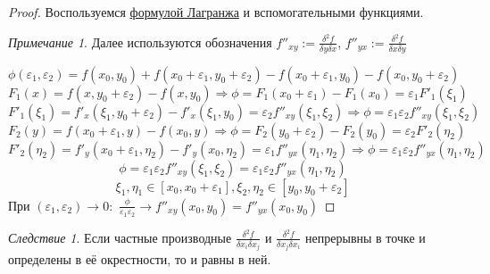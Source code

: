 \documentclass{article}
\theoremstyle{indented}
\theoremstyle{definition}
\theoremstyle{remark}
\newtheorem*{remark}{Примечание}
\newtheorem*{cons}{Следствие}
\begin{document}
\begin{proof}
    Воспользуемся \hyperlink{lagrange}{формулой Лагранжа} и вспомогательными функциями.
    

    \begin{remark}
        Далее используются обозначения
        $f''_{xy}:=\frac{\delta^2 f}{\delta y \delta x}$,
        $f''_{yx}:=\frac{\delta^2 f}{\delta x \delta y}$
    \end{remark}

    \[\phi(\varepsilon_1, \varepsilon_2) =
        f(x_0, y_0)+f(x_0+\varepsilon_1, y_0+\varepsilon_2)
        -f(x_0+\varepsilon_1, y_0)-f(x_0, y_0+\varepsilon_2)\]
    \[F_1(x)=f(x,y_0+\varepsilon_2)-f(x,y_0)
        \Rightarrow \phi = F_1(x_0+\varepsilon_1)-F_1(x_0) = \varepsilon_1 F'_1(\xi_1)\]
    \[F'_1(\xi_1)=f'_x(\xi _1, y_0+\varepsilon_2)-f'_x(\xi_1,y_0)=
        \varepsilon_2 f''_{xy}(\xi_1, \xi_2)
        \Rightarrow \phi = \varepsilon_1 \varepsilon_2 f''_{xy}(\xi_1, \xi_2)\]
    \[F_2(y)=f(x_0+\varepsilon_1,y)-f(x_0,y)
        \Rightarrow \phi = F_2(y_0+\varepsilon_2)-F_2(y_0) = \varepsilon_2 F'_2(\eta_2)\]
    \[F'_2(\eta_2)=f'_y(x_0+\varepsilon_1,\eta_2)-f'_y(x_0,\eta_2)=
        \varepsilon_1 f''_{yx}(\eta_1, \eta_2)
        \Rightarrow \phi = \varepsilon_1 \varepsilon_2 f''_{yx}(\eta_1, \eta_2)\]
    \[\phi = \varepsilon_1 \varepsilon_2 f''_{xy}(\xi_1, \xi_2) = \varepsilon_1 \varepsilon_2 f''_{yx}(\eta _1, \eta _2) \]
    \[\xi_1,\eta_1 \in [x_0, x_0+\varepsilon_1], \xi_2,\eta_2 \in [y_0, y_0+\varepsilon_2]\]
    При $(\varepsilon_1, \varepsilon_2) \to 0:$
    $\frac{\phi}{\varepsilon_1 \varepsilon_2} \to f''_{xy}(x_0, y_0) = f''_{yx}(x_0, y_0)$
\end{proof}

\begin{cons}
    Если частные производные $\frac{\delta^2 f}{\delta x_i \delta x_j}$ и $\frac{\delta^2 f}{\delta x_j \delta x_i}$ непрерывны в точке и определены в её окрестности, то и равны в ней.
\end{cons}
\end{document}
